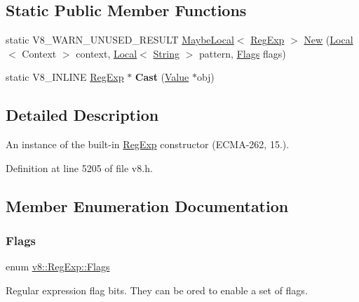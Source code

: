 \subsection*{Static Public Member Functions}
\begin{DoxyCompactItemize}
\item 
static V8\+\_\+\+W\+A\+R\+N\+\_\+\+U\+N\+U\+S\+E\+D\+\_\+\+R\+E\+S\+U\+LT \mbox{\hyperlink{classv8_1_1MaybeLocal}{Maybe\+Local}}$<$ \mbox{\hyperlink{classv8_1_1RegExp}{Reg\+Exp}} $>$ \mbox{\hyperlink{classv8_1_1RegExp_a805f632fe98d58160773a4ba1e424b15}{New}} (\mbox{\hyperlink{classv8_1_1Local}{Local}}$<$ Context $>$ context, \mbox{\hyperlink{classv8_1_1Local}{Local}}$<$ \mbox{\hyperlink{classv8_1_1String}{String}} $>$ pattern, \mbox{\hyperlink{classv8_1_1RegExp_aa4718a5c1f18472aff3bf51ed694fc5a}{Flags}} flags)
\item 
\mbox{\label{classv8_1_1RegExp_ab3f85572312815cbdf5ee368d358c40f}} 
static V8\+\_\+\+I\+N\+L\+I\+NE \mbox{\hyperlink{classv8_1_1RegExp}{Reg\+Exp}} $\ast$ {\bfseries Cast} (\mbox{\hyperlink{classv8_1_1Value}{Value}} $\ast$obj)
\end{DoxyCompactItemize}


\subsection{Detailed Description}
An instance of the built-\/in \mbox{\hyperlink{classv8_1_1RegExp}{Reg\+Exp}} constructor (E\+C\+M\+A-\/262, 15.). 

Definition at line 5205 of file v8.\+h.



\subsection{Member Enumeration Documentation}
\mbox{\label{classv8_1_1RegExp_aa4718a5c1f18472aff3bf51ed694fc5a}} 
\subsubsection{\texorpdfstring{Flags}{Flags}}
{\footnotesize\ttfamily enum \mbox{\hyperlink{classv8_1_1RegExp_aa4718a5c1f18472aff3bf51ed694fc5a}{v8\+::\+Reg\+Exp\+::\+Flags}}}

Regular expression flag bits. They can be or\textquotesingle{}ed to enable a set of flags. 

